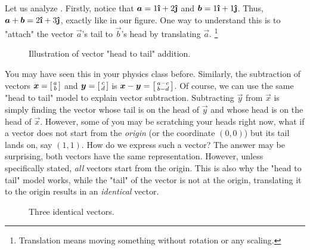 Let us analyze . Firstly, notice that \(\vec{a}=1 \ihat + 2 \jhat\) and \(\vec{b}=1 \ihat + 1 \jhat\). Thus, \(\vec{a}+\vec{b}=2 \ihat + 3 \jhat\), exactly like in our figure. One way to understand this is to "attach" the vector \(\vec{a}\)'s tail to \(\vec{b}\)'s head by translating \(\vec{a}\). \footnote{Translation means moving something without rotation or any scaling.}
\begin{figure}[h]
  \centering
  \caption{Illustration of vector "head to tail" addition.}
  \label{vecaddattach}
\end{figure}
You may have seen this in your physics class before. Similarly, the subtraction of vectors \(\vec{x}=
\begin{bsmallmatrix}
  a \\
  b
\end{bsmallmatrix}
\) and \(\vec{y}=
\begin{bsmallmatrix}
  c \\
  d
\end{bsmallmatrix}
\) is \(\vec{x}-\vec{y}=
\begin{bsmallmatrix}
  a - c \\
  b - d
\end{bsmallmatrix}
\). Of course, we can use the same "head to tail" model to explain vector subtraction. Subtracting \(\vec{y}\) from \(\vec{x}\) is simply finding the vector whose tail is on the head of \(\vec{y}\) and whose head is on the head of \(\vec{x}\). However, some of you may be scratching your heads right now, what if a vector does not start from the \textit{origin} (or the coordinate \((0,0)\)) but its tail lands on, say \((1,1)\). How do we express such a vector? The answer may be surprising, both vectors have the same representation. However, unless specifically stated, \textit{all} vectors start from the origin. This is also why the "head to tail" model works, while the "tail" of the vector is not at the origin, translating it to the origin results in an \textit{identical} vector. 
\begin{figure}[h]
  \centering
  \caption{Three identical vectors.}
\end{figure}



